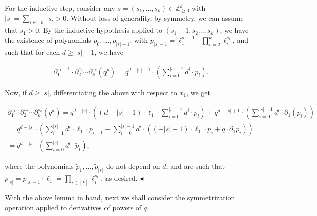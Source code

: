 \documentclass[10pt,a4paper]{article}
\begin{document}
For the inductive step, consider any $s=(s_{1},\dots,s_{k})\in\mathbb{Z}_{\geqslant 0}^{k}$ with $\left|s\right|=\sum_{i\in[k]}s_{i}>0$.
Without loss of generality, by symmetry, we can assume that $s_{1}>0$.
By the inductive hypothesis applied to $(s_{1}-1,s_{2}\dots,s_{k})$, we have the existence of polynomials $p_{0},\dots,p_{\left|s\right|-1}$, with $p_{\left|s\right|-1}=\ell_{1}^{s_{1}-1}\cdot\prod_{i=2}^{k}\ell_{i}^{s_{i}}$, and such that for each $d\geqslant\left|s\right|-1$, we have\par


\[\begin{gathered}
\partial_{1}^{s_{1}-1}\cdot\partial_{2}^{s_{2}}\cdots\partial_{k}^{s_{k}}\left(q^{d}\right)=q^{d-\left|s\right|+1}\cdot\left(\sum_{i=0}^{\left|s\right|-1}d^{i}\cdot p_{i}\right).
\end{gathered}\]


Now, if $d\geqslant\left|s\right|$, differentiating the above with respect to $x_{1}$, we get\par




\[\begin{gathered}
\displaystyle\partial_{1}^{s_{1}}\cdot\partial_{2}^{s_{2}}\cdots\partial_{k}^{s_{k}}\left(q^{d}\right) \displaystyle=q^{d-\left|s\right|}\cdot\left((d-\left|s\right|+1)\cdot\ell_{1}\cdot\sum_{i=0}^{\left|s\right|-1}d^{i}\cdot p_{i}\right)+q^{d-\left|s\right|+1}\cdot\left(\sum_{i=0}^{\left|s\right|-1}d^{i}\cdot\partial_{1}(p_{i})\right) \\
\displaystyle=q^{d-\left|s\right|}\cdot\left(\sum_{i=1}^{\left|s\right|}d^{i}\cdot\ell_{1}\cdot p_{i-1}+\sum_{i=0}^{\left|s\right|-1}d^{i}\cdot\left(\left(-\left|s\right|+1\right)\cdot\ell_{1}\cdot p_{i}+q\cdot\partial_{1}p_{i}\right)\right) \\
\displaystyle=q^{d-\left|s\right|}\cdot\left(\sum_{i=0}^{\left|s\right|}d^{i}\cdot\tilde{p}_{i}\right),
\end{gathered}\]


where the polynomials $\tilde{p}_{1},\dots,\tilde{p}_{\left|s\right|}$ do not depend on $d$, and are such that $\tilde{p}_{\left|s\right|}=p_{\left|s\right|-1}\cdot\ell_{1}=\prod_{i\in[k]}\ell_{i}^{s_{i}}$, as desired.
$\blacktriangleleft$\par




With the above lemma in hand, next we shall consider the symmetrization operation applied to derivatives of powers of $q$.\par
\end{document}
